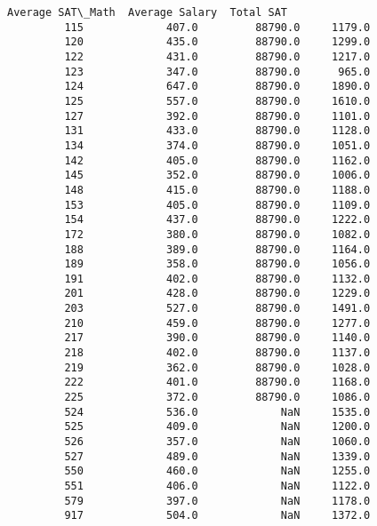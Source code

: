 \documentclass[11pt]{article}
\begin{document}
\begin{Verbatim}[commandchars=\\\{\}]
              Average SAT\_Math  Average Salary  Total SAT  
         115             407.0         88790.0     1179.0  
         120             435.0         88790.0     1299.0  
         122             431.0         88790.0     1217.0  
         123             347.0         88790.0      965.0  
         124             647.0         88790.0     1890.0  
         125             557.0         88790.0     1610.0  
         127             392.0         88790.0     1101.0  
         131             433.0         88790.0     1128.0  
         134             374.0         88790.0     1051.0  
         142             405.0         88790.0     1162.0  
         145             352.0         88790.0     1006.0  
         148             415.0         88790.0     1188.0  
         153             405.0         88790.0     1109.0  
         154             437.0         88790.0     1222.0  
         172             380.0         88790.0     1082.0  
         188             389.0         88790.0     1164.0  
         189             358.0         88790.0     1056.0  
         191             402.0         88790.0     1132.0  
         201             428.0         88790.0     1229.0  
         203             527.0         88790.0     1491.0  
         210             459.0         88790.0     1277.0  
         217             390.0         88790.0     1140.0  
         218             402.0         88790.0     1137.0  
         219             362.0         88790.0     1028.0  
         222             401.0         88790.0     1168.0  
         225             372.0         88790.0     1086.0  
         524             536.0             NaN     1535.0  
         525             409.0             NaN     1200.0  
         526             357.0             NaN     1060.0  
         527             489.0             NaN     1339.0  
         550             460.0             NaN     1255.0  
         551             406.0             NaN     1122.0  
         579             397.0             NaN     1178.0  
         917             504.0             NaN     1372.0  
\end{Verbatim}
            
\end{document}
